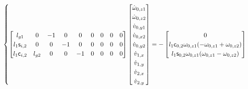 \begin{itemize}
\begin{equation}
\begin{cases}
\begin{bmatrix}
l_{g1} & 0 & -1 & 0 & 0 & 0 & 0 & 0 & 0 \\
l_1 \mathsf{s}_{i,2} & 0 & 0 & -1 & 0 & 0 & 0 & 0 & 0 \\
l_1 \mathsf{c}_{i,2} & l_{g2}  & 0 & 0 & -1 & 0 & 0 & 0 & 0 \\
\end{bmatrix}
\begin{bmatrix}
\dot{\omega}_{0,z1} \\
\dot{\omega}_{0,z2} \\
\dot{v}_{0,y1} \\
\dot{v}_{0,x2} \\
\dot{v}_{0,y2} \\
\dot{v}_{1,x} \\
\dot{v}_{1,y} \\
\dot{v}_{2,x} \\
\dot{v}_{2,y} \\
\end{bmatrix}
=
-
\begin{bmatrix}
0 \\
l_1 \mathsf{c}_{0,2} \omega_{0,z1} (-\omega_{0,z1}+\omega_{0,z2}) \\
l_1 \mathsf{s}_{0,2} \omega_{0,z1} (\omega_{0,z1}-\omega_{0,z2}) \\
\end{bmatrix}

\end{cases}
\end{equation}



\end{itemize}